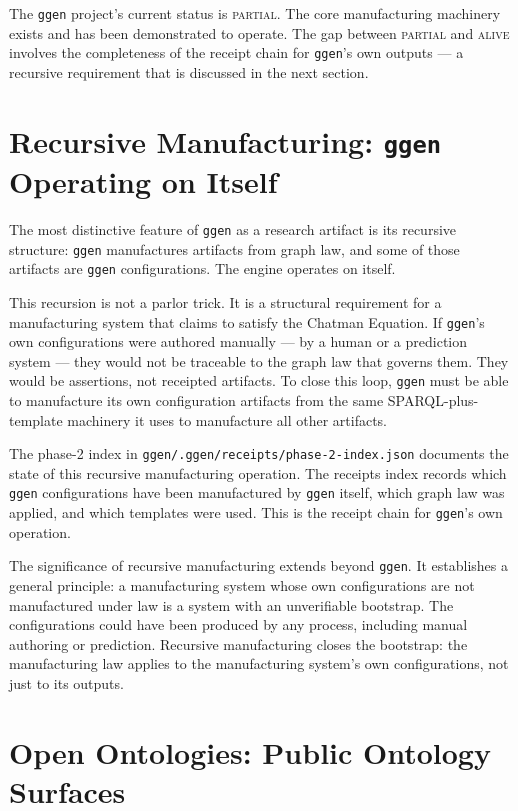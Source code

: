 The \texttt{ggen} project's current status is \textsc{partial}. The core manufacturing machinery exists and has been demonstrated to operate. The gap between \textsc{partial} and \textsc{alive} involves the completeness of the receipt chain for \texttt{ggen}'s own outputs --- a recursive requirement that is discussed in the next section.

\section{Recursive Manufacturing: \texttt{ggen} Operating on Itself}

The most distinctive feature of \texttt{ggen} as a research artifact is its recursive structure: \texttt{ggen} manufactures artifacts from graph law, and some of those artifacts are \texttt{ggen} configurations. The engine operates on itself.

This recursion is not a parlor trick. It is a structural requirement for a manufacturing system that claims to satisfy the Chatman Equation. If \texttt{ggen}'s own configurations were authored manually --- by a human or a prediction system --- they would not be traceable to the graph law that governs them. They would be assertions, not receipted artifacts. To close this loop, \texttt{ggen} must be able to manufacture its own configuration artifacts from the same SPARQL-plus-template machinery it uses to manufacture all other artifacts.

The phase-2 index in \texttt{ggen/.ggen/receipts/phase-2-index.json} documents the state of this recursive manufacturing operation. The receipts index records which \texttt{ggen} configurations have been manufactured by \texttt{ggen} itself, which graph law was applied, and which templates were used. This is the receipt chain for \texttt{ggen}'s own operation.

The significance of recursive manufacturing extends beyond \texttt{ggen}. It establishes a general principle: a manufacturing system whose own configurations are not manufactured under law is a system with an unverifiable bootstrap. The configurations could have been produced by any process, including manual authoring or prediction. Recursive manufacturing closes the bootstrap: the manufacturing law applies to the manufacturing system's own configurations, not just to its outputs.

\section{Open Ontologies: Public Ontology Surfaces}

